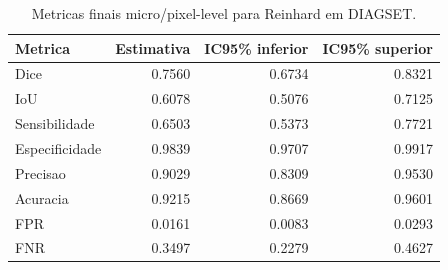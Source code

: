 \begin{table}[!htb]
\centering
\caption{Metricas finais micro/pixel-level para Reinhard em DIAGSET.}
\label{tab:results_diagset-micro-reinhard}
\small
\begin{tabular}{lrrr}
\toprule
Metrica & Estimativa & IC95\% inferior & IC95\% superior \\
\midrule
Dice & 0.7560 & 0.6734 & 0.8321 \\
IoU & 0.6078 & 0.5076 & 0.7125 \\
Sensibilidade & 0.6503 & 0.5373 & 0.7721 \\
Especificidade & 0.9839 & 0.9707 & 0.9917 \\
Precisao & 0.9029 & 0.8309 & 0.9530 \\
Acuracia & 0.9215 & 0.8669 & 0.9601 \\
FPR & 0.0161 & 0.0083 & 0.0293 \\
FNR & 0.3497 & 0.2279 & 0.4627 \\
\bottomrule
\end{tabular}
\end{table}
